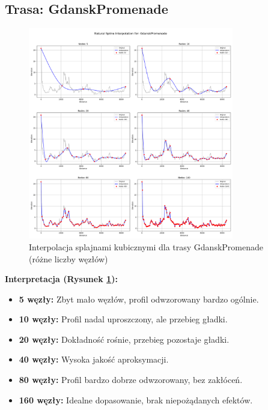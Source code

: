 \documentclass[11pt,a4paper]{article}
\begin{document}
\subsection{Trasa: GdanskPromenade}
\begin{figure}[H]
    \centering
    \includegraphics[width=0.8\textwidth]{plots/GdanskPromenade_Spline_basic.png}
    \caption{Interpolacja splajnami kubicznymi dla trasy GdanskPromenade (różne liczby węzłów)}
    \label{fig:promenade_splajny}
\end{figure}
\textbf{Interpretacja (Rysunek \ref{fig:promenade_splajny}):} 
\begin{itemize}
    \item \textbf{5 węzły:} Zbyt mało węzłów, profil odwzorowany bardzo ogólnie.
    \item \textbf{10 węzły:} Profil nadal uproszczony, ale przebieg gładki.
    \item \textbf{20 węzły:} Dokładność rośnie, przebieg pozostaje gładki.
    \item \textbf{40 węzły:} Wysoka jakość aproksymacji.
    \item \textbf{80 węzły:} Profil bardzo dobrze odwzorowany, bez zakłóceń.
    \item \textbf{160 węzły:} Idealne dopasowanie, brak niepożądanych efektów.
\end{itemize}
\end{document}

